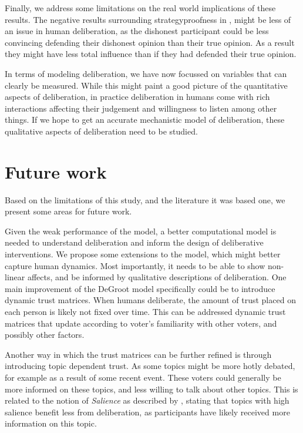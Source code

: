 Finally, we address some limitations on the real world implications of these results.
The negative results surrounding strategyproofness in , might be less
of an issue in human deliberation, as the dishonest participant could be less convincing
defending their dishonest opinion than their true opinion. As a result they might have less
total influence than if they had defended their true opinion.

In terms of modeling deliberation, we have now focussed on variables that can
clearly be measured. While this might paint a good picture of the quantitative
aspects of deliberation, in practice deliberation in humans come with rich interactions
affecting their judgement and willingness to listen among other things. If we hope to
get an accurate mechanistic model of deliberation, these qualitative aspects of deliberation
need to be studied.









\section{Future work}

Based on the limitations of this study, and the literature it was based one, we present some areas for future work.

Given the weak performance of the model, a better computational model is needed
to understand deliberation and inform the design of deliberative interventions.
We propose some extensions to the model, which might better capture human
dynamics. Most importantly, it needs to be able to show non-linear affects, and
be informed by qualitative descriptions of deliberation. One main improvement of the DeGroot model specifically could be to introduce dynamic trust matrices.
When humans deliberate, the amount of trust placed on each person is likely not
fixed over time. This can be addressed dynamic trust matrices that update according
to voter's familiarity with other voters, and possibly other factors.

Another way in which the trust matrices can be further refined is through
introducing topic dependent trust. As some topics might be more hotly debated,
for example as a result of some recent event. These voters could generally be
more informed on these topics, and less willing to talk about other topics.
This is related to the notion of \textit{Salience} as described by
\citet{listDeliberationSinglePeakednessPossibility2013}, stating that topics
with high salience benefit less from deliberation, as participants have likely
received more information on this topic.

